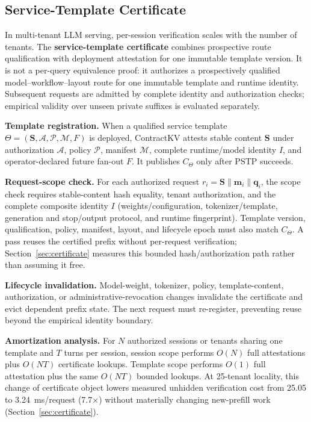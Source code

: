 \documentclass[journal]{IEEEtran}
\begin{document}
\subsection{Service-Template Certificate}
\label{sec:template}

In multi-tenant LLM serving, per-session verification scales with the number of tenants. The \textbf{service-template certificate} combines prospective route qualification with deployment attestation for one immutable template version. It is not a per-query equivalence proof: it authorizes a prospectively qualified model--workflow--layout route for one immutable template and runtime identity. Subsequent requests are admitted by complete identity and authorization checks; empirical validity over unseen private suffixes is evaluated separately.

\smallskip
\noindent\textbf{Template registration.}
When a qualified service template $\Theta=(\mathbf{S},\mathcal{A},\mathcal{P},\mathcal{M},F)$ is deployed, ContractKV attests stable content $\mathbf{S}$ under authorization $\mathcal{A}$, policy $\mathcal{P}$, manifest $\mathcal{M}$, complete runtime/model identity $I$, and operator-declared future fan-out $F$. It publishes $C_\Theta$ only after PSTP succeeds.

\smallskip
\noindent\textbf{Request-scope check.}
For each authorized request $r_i=\mathbf{S}\|\mathbf{m}_i\|\mathbf{q}_i$, the scope check requires stable-content hash equality, tenant authorization, and the complete composite identity $I$ (weights/configuration, tokenizer/template, generation and stop/output protocol, and runtime fingerprint). Template version, qualification, policy, manifest, layout, and lifecycle epoch must also match $C_\Theta$. A pass reuses the certified prefix without per-request verification; Section~\ref{sec:certificate} measures this bounded hash/authorization path rather than assuming it free.

\smallskip
\noindent\textbf{Lifecycle invalidation.}
Model-weight, tokenizer, policy, template-content, authorization, or administrative-revocation changes invalidate the certificate and evict dependent prefix state. The next request must re-register, preventing reuse beyond the empirical identity boundary.

\smallskip
\noindent\textbf{Amortization analysis.}
For $N$ authorized sessions or tenants sharing one template and $T$ turns per session, session scope performs $O(N)$ full attestations plus $O(NT)$ certificate lookups. Template scope performs $O(1)$ full attestation plus the same $O(NT)$ bounded lookups. At 25-tenant locality, this change of certificate object lowers measured unhidden verification cost from 25.05 to 3.24~ms/request (7.7$\times$) without materially changing new-prefill work (Section~\ref{sec:certificate}).
\end{document}
